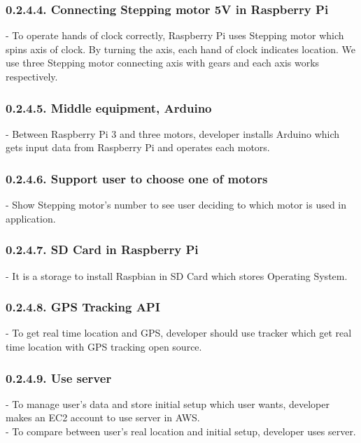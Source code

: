 \documentclass[10pt,a4paper,twocolumn]{report}
\begin{document}
		\subsubsection{0.2.4.4. Connecting Stepping motor 5V in Raspberry Pi}
		- To operate hands of clock correctly, Raspberry Pi uses Stepping motor which spins axis of clock. By turning the axis, each hand of clock indicates location. We use three Stepping motor connecting axis with gears and each axis works respectively.\\
		
		\subsubsection{0.2.4.5. Middle equipment, Arduino}
		- Between Raspberry Pi 3 and three motors, developer installs Arduino which gets input data from Raspberry Pi and operates each motors.\\
		
		\subsubsection{0.2.4.6. Support user to choose one of motors}
		- Show Stepping motor’s number to see user deciding to which motor is used in application.\\

		\subsubsection{0.2.4.7. SD Card in Raspberry Pi }
		- It is a storage to install Raspbian in SD Card which stores Operating System.\\
		
		\subsubsection{0.2.4.8. GPS Tracking API}
		- To get real time location and GPS, developer should use tracker which get real time location with GPS tracking open source.\\
		
		\subsubsection{0.2.4.9. Use server}
		- To manage user’s data and store initial setup which user wants, developer makes an EC2 account to use server in AWS.\\
- To compare between user’s real location and initial setup, developer uses server.\\
\end{document}
